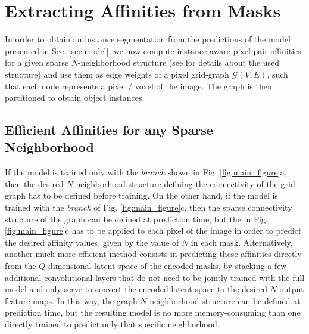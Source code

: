\section{Extracting Affinities from \maskname Masks}
In order to obtain an instance segmentation from the predictions of the model presented in Sec. \ref{sec:model}, we now compute instance-aware pixel-pair affinities for a given sparse $N$-neighborhood structure (see  for details about the used structure) and use them as edge weights of a pixel grid-graph $\mathcal{G}(V,E)$, such that each node represents a pixel / voxel of the image. The graph is then partitioned to obtain object instances.



\subsection{Efficient Affinities for any Sparse Neighborhood}\label{sec:efficient_affs}
If the model is trained only with the \emph{\sparseBr branch} shown in Fig. \ref{fig:main_figure}a, then the desired $N$-neighborhood structure defining the connectivity of the grid-graph has to be defined before training. 
On the other hand, if the model is trained with the \emph{\encBr branch} of Fig. \ref{fig:main_figure}c, then the sparse connectivity structure of the graph can be defined at prediction time, but the \maskDec in Fig. \ref{fig:main_figure}c has to be applied to each pixel of the image in order to predict the desired affinity values, given by the value of $N$ in each mask. 
Alternatively, another much more efficient method consists in predicting these affinities directly from the $Q$-dimensional latent space of the encoded masks, by stacking a few additional convolutional layers that do not need to be jointly trained with the full model and only serve to convert the encoded latent space to the desired $N$ output feature maps.
In this way, the graph $N$-neighborhood structure can be defined at prediction time, but the resulting model is no more memory-consuming than one directly trained to predict only that specific neighborhood. 



